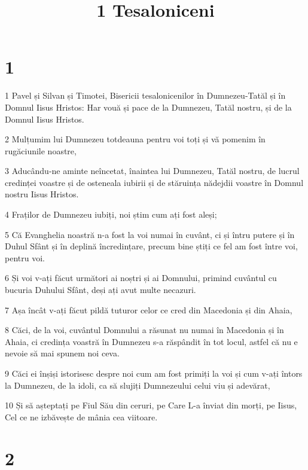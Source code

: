 

\title{1 Tesaloniceni}


\chapter{1}

\par 1 Pavel și Silvan și Timotei, Bisericii tesalonicenilor în Dumnezeu-Tatăl și în Domnul Iisus Hristos: Har vouă și pace de la Dumnezeu, Tatăl nostru, și de la Domnul Iisus Hristos.
\par 2 Mulțumim lui Dumnezeu totdeauna pentru voi toți și vă pomenim în rugăciunile noastre,
\par 3 Aducându-ne aminte neîncetat, înaintea lui Dumnezeu, Tatăl nostru, de lucrul credinței voastre și de osteneala iubirii și de stăruința nădejdii voastre în Domnul nostru Iisus Hristos.
\par 4 Fraților de Dumnezeu iubiți, noi știm cum ați fost aleși;
\par 5 Că Evanghelia noastră n-a fost la voi numai în cuvânt, ci și întru putere și în Duhul Sfânt și în deplină încredințare, precum bine știți ce fel am fost între voi, pentru voi.
\par 6 Și voi v-ați făcut următori ai noștri și ai Domnului, primind cuvântul cu bucuria Duhului Sfânt, deși ați avut multe necazuri.
\par 7 Așa încât v-ați făcut pildă tuturor celor ce cred din Macedonia și din Ahaia,
\par 8 Căci, de la voi, cuvântul Domnului a răsunat nu numai în Macedonia și în Ahaia, ci credința voastră în Dumnezeu s-a răspândit în tot locul, astfel că nu e nevoie să mai spunem noi ceva.
\par 9 Căci ei înșiși istorisesc despre noi cum am fost primiți la voi și cum v-ați întors la Dumnezeu, de la idoli, ca să slujiți Dumnezeului celui viu și adevărat,
\par 10 Și să așteptați pe Fiul Său din ceruri, pe Care L-a înviat din morți, pe Iisus, Cel ce ne izbăvește de mânia cea viitoare.

\chapter{2}

